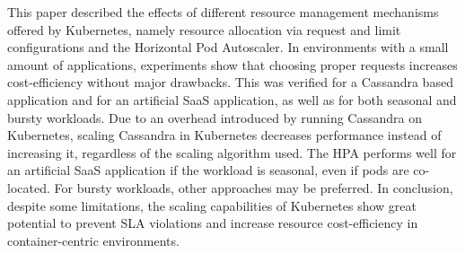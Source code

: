 This paper described the effects of different resource management mechanisms offered by Kubernetes, namely resource allocation via request and limit configurations and the Horizontal Pod Autoscaler. In environments with a small amount of applications, experiments show that choosing proper requests increases cost-efficiency without major drawbacks. This was verified for a Cassandra based application and for an artificial SaaS application, as well as for both seasonal and bursty workloads. Due to an overhead introduced by running Cassandra on Kubernetes, scaling Cassandra in Kubernetes decreases performance instead of increasing it, regardless of the scaling algorithm used. The HPA performs well for an artificial SaaS application if the workload is seasonal, even if pods are co-located. For bursty workloads, other approaches may be preferred. In conclusion, despite some limitations, the scaling capabilities of Kubernetes show great potential to prevent SLA violations and increase resource cost-efficiency in container-centric environments.




